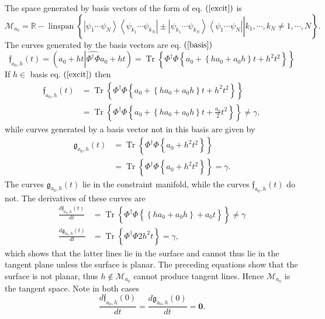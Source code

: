 \documentclass[aps,preprint]{revtex4}%
\begin{document}
The space generated by basis vectors of the form of eq. $\left(
\ref{excit}\right)  $ is
\begin{equation}
\mathcal{M}_{a_{0}}=\mathbb{R}-\operatorname{linspan}\left\{  \left.
\overset{}{\left\vert \psi_{1}\cdots\psi_{N}\right\rangle \left\langle
\psi_{k_{1}}\cdots\psi_{k_{N}}\right\vert \pm\left\vert \psi_{k_{1}}\cdots
\psi_{k_{N}}\right\rangle \left\langle \psi_{1}\cdots\psi_{N}\right\vert
}\right\vert k_{1},\cdots,k_{N}\neq1,\cdots,N\right\}  .
\end{equation}
The curves generated by the basis vectors are eq. $\left(  \ref{basis}\right)
$
\begin{equation}
\mathfrak{f}_{a_{0},h}\left(  t\right)  =\left(  a_{0}+ht\left\vert
\widehat{\Phi^{\dagger}\Phi}\right.  a_{0}+ht\right)  =\operatorname{Tr}%
\left\{  \overset{}{\Phi^{\dagger}\Phi\left\{  \overset{}{a_{0}+\left\{
ha_{0}+a_{0}h\right\}  t+h^{2}t^{2}}\right\}  }\right\}
\end{equation}
If $h\in$ basis eq. $\left(  \ref{excit}\right)  $ then
\begin{align}
\mathfrak{f}_{a_{0},h}\left(  t\right)   &  =\operatorname{Tr}\left\{
\overset{}{\Phi^{\dagger}\Phi\left\{  \overset{}{a_{0}+\left\{  ha_{0}%
+a_{0}h\right\}  t+h^{2}t^{2}}\right\}  }\right\} \nonumber\\
&  =\operatorname{Tr}\left\{  \overset{}{\Phi^{\dagger}\Phi\left\{  \overset
{}{a_{0}+\left\{  ha_{0}+a_{0}h\right\}  t+\frac{a_{0}}{2}t^{2}}\right\}
}\right\}  \neq\gamma,
\end{align}
while curves generated by a basis vector not in this basis are given by
\begin{align}
\mathfrak{g}_{a_{0},h}\left(  t\right)   &  =\operatorname{Tr}\left\{
\overset{}{\Phi^{\dagger}\Phi\left\{  \overset{}{a_{0}+h^{2}t^{2}}\right\}
}\right\} \nonumber\\
&  =\operatorname{Tr}\left\{  \overset{}{\Phi^{\dagger}\Phi\left\{  \overset
{}{a_{0}+h^{2}t^{2}}\right\}  }\right\}  =\gamma.
\end{align}
The curves $\mathfrak{g}_{a_{0},h}\left(  t\right)  $ lie in the constraint
manifold, while the curves $\mathfrak{f}_{a_{0},h}\left(  t\right)  $ do not.
The derivatives of these curves are
\begin{align}
\frac{d\mathfrak{f}_{a_{0},h}\left(  t\right)  }{dt}  &  =\operatorname{Tr}%
\left\{  \overset{}{\Phi^{\dagger}\Phi\left\{  \overset{}{\left\{
ha_{0}+a_{0}h\right\}  +a_{0}t}\right\}  }\right\}  \neq\gamma\\
\frac{d\mathfrak{g}_{a_{0},h}\left(  t\right)  }{dt}  &  =\operatorname{Tr}%
\left\{  \overset{}{\Phi^{\dagger}\Phi\overset{}{2h^{2}t}}\right\}  =\gamma,
\end{align}
which shows that the latter lines lie in the surface and cannot thus lie in
the tangent plane unless the surface is planar. The preceding equations show
that the surface is not planar, thus $h\notin\mathcal{M}_{a_{0}}$ cannot
produce tangent lines. Hence $\mathcal{M}_{a_{0}}$ is the tangent space. Note
in both cases
\begin{equation}
\frac{d\mathfrak{f}_{a_{0},h}\left(  0\right)  }{dt}=\frac{d\mathfrak{g}%
_{a_{0},h}\left(  0\right)  }{dt}=\mathbf{0}.
\end{equation}
\end{document}
